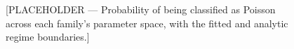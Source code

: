 \documentclass[twoside]{article}
\begin{document}
\begin{figure}[t]
\vspace{.3in}
\centerline{}
\vspace{.3in}
\caption{[PLACEHOLDER — Probability of being classified as Poisson across each family's parameter space, with the fitted
and analytic regime boundaries.]}
\label{fig:regime}
\end{figure}
\end{document}
